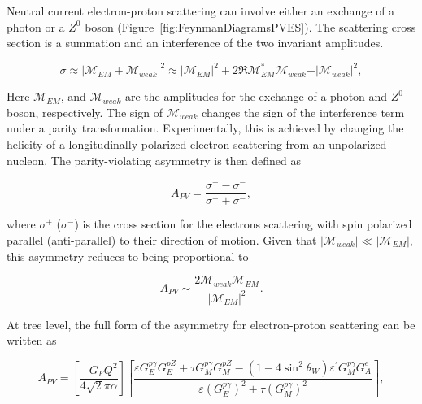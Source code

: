 Neutral current electron-proton scattering can involve either an exchange of a photon or a $Z^{0}$ boson (Figure~\ref{fig:FeynmanDiagramsPVES}). The scattering cross section is a summation and an interference of the two invariant amplitudes.

\begin{equation} \label{equ:qweak1}
\sigma \approx \vert \mathcal{M}_{EM} + \mathcal{M}_{weak} \vert^{2} \approx \vert \mathcal{M}_{EM} \vert^{2} + 2 \Re \mathcal{M}_{EM}^{*}\mathcal{M}_{weak} + \vert \mathcal{M}_{weak} \vert^{2}, 
\end{equation}

Here $\mathcal{M}_{EM}$, and $\mathcal{M}_{weak}$ are the amplitudes for the exchange of a photon and $Z^{0}$ boson, respectively. 
The sign of $\mathcal{M}_{weak}$ changes the sign of the interference term under a parity transformation. Experimentally, this is achieved by changing the helicity of a longitudinally polarized electron scattering from an unpolarized nucleon. The parity-violating asymmetry is then defined as

\begin{equation} \label{equ:qweak2}
A_{PV} = \frac{\sigma^{+} - \sigma^{-} }{\sigma^{+} + \sigma^{-}},
\end{equation}

\noindent
where $\sigma^{+}$ ($\sigma^{-}$)
is the cross section for the electrons scattering with spin polarized parallel (anti-parallel) to their direction of motion.
Given that $\vert \mathcal{M}_{weak} \vert \ll \vert \mathcal{M}_{EM} \vert$, this asymmetry reduces to being proportional to

\begin{equation} \label{equ:qweak3}
A_{PV} \sim \frac{2 \mathcal{M}_{weak} \mathcal{M}_{EM}}{\vert \mathcal{M}_{EM} \vert^{2}}.
\end{equation}

At tree level, the full form of the asymmetry for electron-proton scattering can be written as~\cite{qweak_proposal_2007}

\begin{equation} \label{equ:qweak4}
A_{PV} = \left[ \frac{-G_{F}Q^{2}}{4 \sqrt{2}\pi\alpha} \right] \left[ \frac{{\varepsilon} {G_{E}^{p\gamma}}G_{E}^{pZ} + {\tau} {G_{M}^{p\gamma}}G_{M}^{pZ} - (1-4\sin^{2}\theta_{W}){\varepsilon^{\prime}}{G_{M}^{p\gamma}}{G_{A}^{e}} } { {\varepsilon}({G_{E}^{p\gamma}})^{2} + {\tau}({G_{M}^{p\gamma}})^{2} } \right],
\end{equation}

